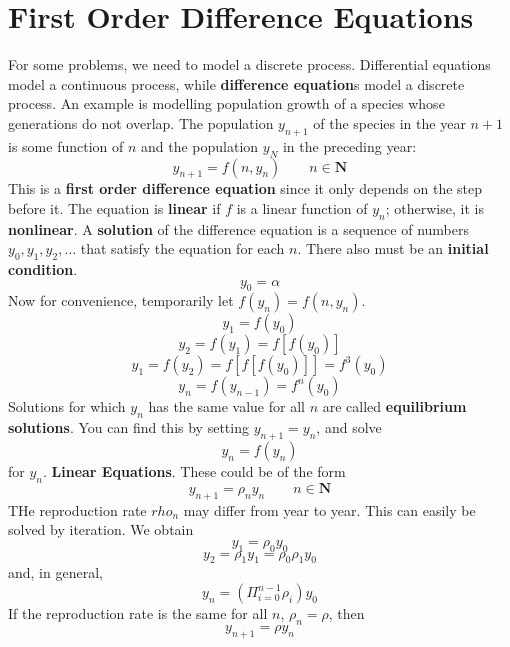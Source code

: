 \section{First Order Difference Equations}
    For some problems, we need to model a discrete process. Differential equations model a continuous process, while \textbf{difference equation}s model a discrete process. An example is modelling population growth of a species whose generations do not overlap. The population $y_{n+1}$ of the species in the year $n+1$ is some function of $n$ and the population $y_N$ in the preceding year:
    \begin{equation*}
        y_{n+1} = f(n, y_n) \qquad n \in \textbf{N}
    \end{equation*}
    This is a \textbf{first order difference equation} since it only depends on the step before it. The equation is \textbf{linear} if $f$ is a linear function of $y_n$; otherwise, it is \textbf{nonlinear}. A \textbf{solution} of the difference equation is a sequence of numbers $y_0, y_1, y_2, \dots$ that satisfy the equation for each $n$. There also must be an \textbf{initial condition}. 
    $$ y_0 = \alpha $$
    Now for convenience, temporarily let $f(y_n) = f(n, y_n)$.
    $$ y_1 = f(y_0) $$
    $$ y_2 = f(y_1) = f[f(y_0)] $$
    $$ y_1 = f(y_2) = f[f[f(y_0)]] = f^3(y_0) $$
    $$ y_n = f(y_{n-1}) = f^n(y_0) $$
    \indent Solutions for which $y_n$ has the same value for all $n$ are called \textbf{equilibrium solutions}. You can find this by setting $y_{n+1} = y_n$, and solve
    \begin{equation*}
        y_n = f(y_n)
    \end{equation*}
    for $y_n$.
    \newline \indent \textbf{Linear Equations}. These could be of the form
    \begin{equation*}
        y_{n+1} = \rho_n y_n \qquad n \in \textbf{N}
    \end{equation*}
    THe reproduction rate $rho_n$ may differ from year to year. This can easily be solved by iteration. We obtain
    $$ y_1 = \rho_0y_0 $$
    $$ y_2 = \rho_1y_1 = \rho_0\rho_1y_0 $$
    and, in general,
    \begin{equation*}
        y_n = (\Pi_{i=0}^{n-1}\rho_i) y_0
    \end{equation*}
    If the reproduction rate is the same for all $n$, $\rho_n = \rho$, then
    \begin{equation*}
        y_{n+1} = \rho y_n
    \end{equation*}
